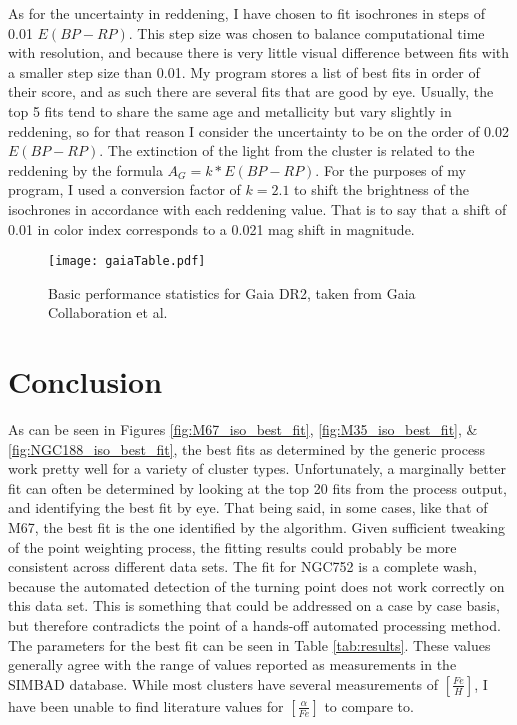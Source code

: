 \documentclass[aps,prb,twocolumn,groupedaddress,nofootinbib,floatfix]{revtex4-1}
\begin{document}
As for the uncertainty in reddening, I have chosen to fit isochrones in steps of 0.01 $E(BP-RP)$. This step size was chosen to balance computational time with resolution, and because there is very little visual difference between fits with a smaller step size than 0.01. My program stores a list of best fits in order of their score, and as such there are several fits that are good by eye. Usually, the top 5 fits tend to share the same age and metallicity but vary slightly in reddening, so for that reason I consider the uncertainty to be on the order of 0.02 $E(BP-RP)$. The extinction of the light from the cluster is related to the reddening by the formula $A_G = k*E(BP-RP)$. For the purposes of my program, I used a conversion factor of $k=2.1$ to shift the brightness of the isochrones in accordance with each reddening value. That is to say that a shift of 0.01 in color index corresponds to a 0.021 mag shift in magnitude.

\begin{figure}[!h]
	\centering
      \texttt{[image: gaiaTable.pdf]}
	\caption{Basic performance statistics for Gaia DR2, taken from Gaia Collaboration et al.}
	\label{fig:gaiaTable}
\end{figure}


\section*{Conclusion}
As can be seen in Figures \ref{fig:M67_iso_best_fit}, \ref{fig:M35_iso_best_fit}, \& \ref{fig:NGC188_iso_best_fit}, the best fits as determined by the generic process work pretty well for a variety of cluster types. Unfortunately, a marginally better fit can often be determined by looking at the top 20 fits from the process output, and identifying the best fit by eye. That being said, in some cases, like that of M67, the best fit is the one identified by the algorithm. Given sufficient tweaking of the point weighting process, the fitting results could probably be more consistent across different data sets. The fit for NGC752 is a complete wash, because the automated detection of the turning point does not work correctly on this data set. This is something that could be addressed on a case by case basis, but therefore contradicts the point of a hands-off automated processing method. The parameters for the best fit can be seen in Table \ref{tab:results}. These values generally agree with the range of values reported as measurements in the SIMBAD database. While most clusters have several measurements of $\left[\frac{Fe}{H}\right]$, I have been unable to find literature values for $\left[\frac{\alpha}{Fe}\right]$ to compare to.
\end{document}
